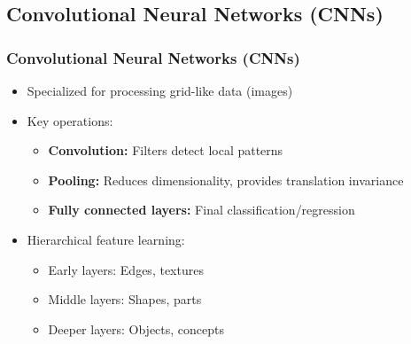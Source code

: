\documentclass[5pt,aspectratio=169]{beamer}
\begin{document}
\subsection{Convolutional Neural Networks (CNNs)}
\begin{frame}
\frametitle{Convolutional Neural Networks (CNNs)}
\begin{itemize}
    \item Specialized for processing grid-like data (images)
    \item Key operations:
    \begin{itemize}
        \item \textbf{Convolution:} Filters detect local patterns
        \item \textbf{Pooling:} Reduces dimensionality, provides translation invariance
        \item \textbf{Fully connected layers:} Final classification/regression
    \end{itemize}
    \item Hierarchical feature learning:
    \begin{itemize}
        \item Early layers: Edges, textures
        \item Middle layers: Shapes, parts
        \item Deeper layers: Objects, concepts
    \end{itemize}
\end{itemize}
\end{frame}
\end{document}

